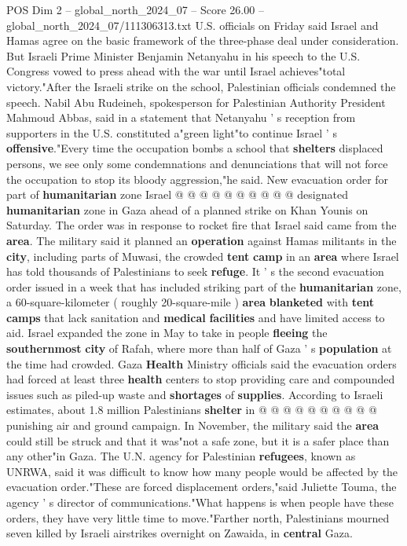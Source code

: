\begin{textsample}{POS Dim 2 – global\_north\_2024\_07 – Score 26.00 – global\_north\_2024\_07/111306313.txt}
U.S. officials on Friday said Israel and Hamas agree on the basic framework of the three-phase deal under consideration.
But Israeli Prime Minister Benjamin Netanyahu in his speech to the U.S.
Congress vowed to press ahead with the war until Israel achieves"total victory."After the Israeli strike on the school, Palestinian officials condemned the speech.
Nabil Abu Rudeineh, spokesperson for Palestinian Authority President Mahmoud Abbas, said in a statement that Netanyahu ' s reception from supporters in the U.S. constituted a"green light"to continue Israel ' s \textbf{offensive}."Every time the occupation bombs a school that \textbf{shelters} displaced persons, we see only some condemnations and denunciations that will not force the occupation to stop its bloody aggression,"he said.
New evacuation order for part of \textbf{humanitarian} zone Israel @ @ @ @ @ @ @ @ @ @ designated \textbf{humanitarian} zone in Gaza ahead of a planned strike on Khan Younis on Saturday.
The order was in response to rocket fire that Israel said came from the \textbf{area}.
The military said it planned an \textbf{operation} against Hamas militants in the \textbf{city}, including parts of Muwasi, the crowded \textbf{tent} \textbf{camp} in an \textbf{area} where Israel has told thousands of Palestinians to seek \textbf{refuge}.
It ' s the second evacuation order issued in a week that has included striking part of the \textbf{humanitarian} zone, a 60-square-kilometer ( roughly 20-square-mile ) \textbf{area} \textbf{blanketed} with \textbf{tent} \textbf{camps} that lack sanitation and \textbf{medical} \textbf{facilities} and have limited access to aid.
Israel expanded the zone in May to take in people \textbf{fleeing} the \textbf{southernmost} \textbf{city} of Rafah, where more than half of Gaza ' s \textbf{population} at the time had crowded.
Gaza \textbf{Health} Ministry officials said the evacuation orders had forced at least three \textbf{health} centers to stop providing care and compounded issues such as piled-up waste and \textbf{shortages} of \textbf{supplies}.
According to Israeli estimates, about 1.8 million Palestinians \textbf{shelter} in @ @ @ @ @ @ @ @ @ @ punishing air and ground campaign.
In November, the military said the \textbf{area} could still be struck and that it was"not a safe zone, but it is a safer place than any other"in Gaza.
The U.N. agency for Palestinian \textbf{refugees}, known as UNRWA, said it was difficult to know how many people would be affected by the evacuation order."These are forced displacement orders,"said Juliette Touma, the agency ' s director of communications."What happens is when people have these orders, they have very little time to move."Farther north, Palestinians mourned seven killed by Israeli airstrikes overnight on Zawaida, in \textbf{central} Gaza.

\end{textsample}
